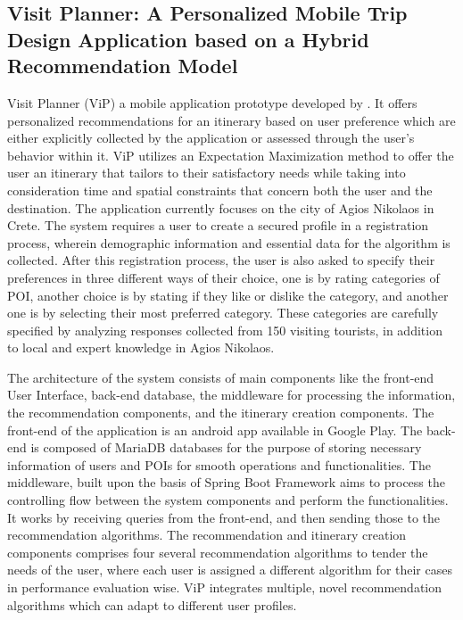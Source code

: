 \subsection{Visit Planner: A Personalized Mobile Trip Design Application based on a Hybrid Recommendation Model}

Visit Planner (ViP) a mobile application prototype developed by \textcite{papadakis2024}. It offers personalized recommendations for an itinerary based on user preference which are either explicitly collected by the application or assessed through the user’s behavior within it. ViP utilizes an Expectation Maximization method to offer the user an itinerary that tailors to their satisfactory needs while taking into consideration time and spatial constraints that concern both the user and the destination. The application currently focuses on the city of Agios Nikolaos in Crete. The system requires a user to create a secured profile in a registration process, wherein demographic information and essential data for the algorithm is collected. After this registration process, the user is also asked to specify their preferences in three different ways of their choice, one is by rating categories of POI, another choice is by stating if they like or dislike the category, and another one is by selecting their most preferred category. These categories are carefully specified by analyzing responses collected from 150 visiting tourists, in addition to local and expert knowledge in Agios Nikolaos.

The architecture of the system consists of main components like the front-end User Interface, back-end database, the middleware for processing the information, the recommendation components, and the itinerary creation components. The front-end of the application is an android app available in Google Play. The back-end is composed of MariaDB databases for the purpose of storing necessary information of users and POIs for smooth operations and functionalities. The middleware, built upon the basis of Spring Boot Framework aims to process the controlling flow between the system components and perform the functionalities. It works by receiving queries from the front-end, and then sending those to the recommendation algorithms. The recommendation and itinerary creation components comprises four several recommendation algorithms to tender the needs of the user, where each user is assigned a different algorithm for their cases in performance evaluation wise. ViP integrates multiple, novel recommendation algorithms which can adapt to different user profiles.

